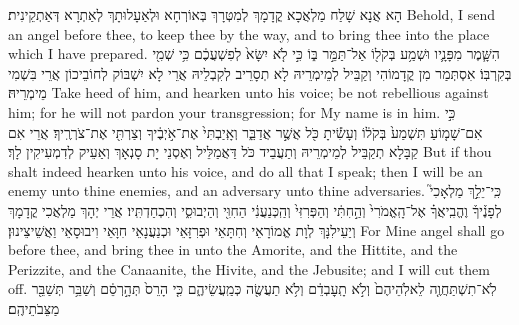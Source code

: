 {{}
{הָא אֲנָא שָׁלַח מַלְאֲכָא קֳדָמָךְ לְמִטְּרָךְ בְּאוֹרְחָא וּלְאַעָלוּתָךְ לְאַתְרָא דְּאַתְקֵינִית׃}
{Behold, I send an angel before thee, to keep thee by the way, and to bring thee into the place which I have prepared.}{}
{הִשָּׁ֧מֶר מִפָּנָ֛יו וּשְׁמַ֥ע בְּקֹל֖וֹ אַל־תַּמֵּ֣ר בּ֑וֹ כִּ֣י לֹ֤א יִשָּׂא֙ לְפִשְׁעֲכֶ֔ם כִּ֥י שְׁמִ֖י בְּקִרְבּֽוֹ׃
}
{אִסְתְּמַר מִן קֳדָמוֹהִי וְקַבֵּיל לְמֵימְרֵיהּ לָא תְסָרֵיב לְקִבְלֵיהּ אֲרֵי לָא יִשְׁבּוֹק לְחוֹבֵיכוֹן אֲרֵי בִּשְׁמִי מֵימְרֵיהּ׃}
{Take heed of him, and hearken unto his voice; be not rebellious against him; for he will not pardon your transgression; for My name is in him.}{}
{כִּ֣י אִם־שָׁמ֤וֹעַ תִּשְׁמַע֙ בְּקֹל֔וֹ וְעָשִׂ֕יתָ כֹּ֖ל אֲשֶׁ֣ר אֲדַבֵּ֑ר וְאָֽיַבְתִּי֙ אֶת־אֹ֣יְבֶ֔יךָ וְצַרְתִּ֖י אֶת־צֹרְרֶֽיךָ׃
}
{אֲרֵי אִם קַבָּלָא תְקַבֵּיל לְמֵימְרֵיהּ וְתַעֲבֵיד כֹּל דַּאֲמַלֵּיל וְאֶסְנֵי יָת סָנְאָךְ וְאַעֵיק לְדִמְעִיקִין לָךְ׃}
{But if thou shalt indeed hearken unto his voice, and do all that I speak; then I will be an enemy unto thine enemies, and an adversary unto thine adversaries.}{}
{כִּֽי־יֵלֵ֣ךְ מַלְאָכִי֮ לְפָנֶ֒יךָ֒ וֶהֱבִֽיאֲךָ֗ אֶל־הָֽאֱמֹרִי֙ וְהַ֣חִתִּ֔י וְהַפְּרִזִּי֙ וְהַֽכְּנַעֲנִ֔י הַחִוִּ֖י וְהַיְבוּסִ֑י וְהִכְחַדְתִּֽיו׃}
{אֲרֵי יְהָךְ מַלְאֲכִי קֳדָמָךְ וְיַעֵילִנָּךְ לְוָת אֱמוֹרָאֵי וְחִתָּאֵי וּפְרִזָּאֵי וּכְנַעֲנָאֵי חִוָּאֵי וִיבוּסָאֵי וַאֲשֵׁיצֵינוּן׃}
{For Mine angel shall go before thee, and bring thee in unto the Amorite, and the Hittite, and the Perizzite, and the Canaanite, the Hivite, and the Jebusite; and I will cut them off.}{}
{לֹֽא־תִשְׁתַּחֲוֶ֤ה לֵאלֹֽהֵיהֶם֙ וְלֹ֣א תָֽעׇבְדֵ֔ם וְלֹ֥א תַעֲשֶׂ֖ה כְּמַֽעֲשֵׂיהֶ֑ם כִּ֤י הָרֵס֙ תְּהָ֣רְסֵ֔ם וְשַׁבֵּ֥ר תְּשַׁבֵּ֖ר מַצֵּבֹתֵיהֶֽם׃
}}
